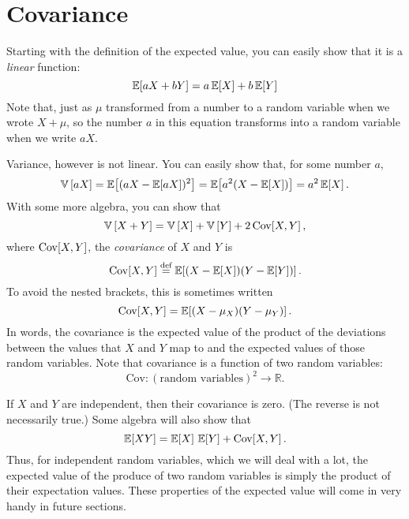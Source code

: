 \section{Covariance}

Starting with the definition of the expected value, you can easily show that
it is a \emph{linear} function:
\begin{equation*}
\mathbb{E}\!\left[{aX + bY}\right] = a \,\mathbb{E}\!\left[{X}\right] + b \,\mathbb{E}\!\left[{Y}\right]
\end{equation*}
Note that, just as $\mu$ transformed from a number to a random variable when we wrote
$X + \mu$, so the number $a$ in this equation transforms into a random variable
when we write $aX$.

Variance, however is not linear. You can easily show that, for some number $a$,
\begin{equation*}
  \mathbb{V}\left[{aX}\right] = \mathbb{E}\!\left[{(aX - \mathbb{E}\!\left[{aX}\right])^2}\right] = \mathbb{E}\!\left[{a^2(X - \mathbb{E}\!\left[{X}\right])}\right] = a^2 \, \mathbb{E}\!\left[{X}\right].
\end{equation*}
With some more algebra, you can show that
\begin{equation*}
  \mathbb{V}\left[{X + Y}\right] = \mathbb{V}\left[{X}\right] + \mathbb{V}\left[{Y}\right] + 2 \,\mathrm{Cov}\!\left[{X, Y}\right],
\end{equation*}
where $\mathrm{Cov}\!\left[{X, Y}\right]$, the \emph{covariance} of $X$ and $Y$ is
\begin{equation*}
  \mathrm{Cov}\!\left[{X, Y}\right] \stackrel{\text{def}}{=} \mathbb{E}\!\left[{(X - \mathbb{E}\!\left[{X}\right])(Y - \mathbb{E}\!\left[{Y}\right])}\right].
\end{equation*}
To avoid the nested brackets, this is sometimes written
\begin{equation*}
\mathrm{Cov}\!\left[{X, Y}\right] = \mathbb{E}\!\left[{(X - \mu_X)(Y - \mu_Y)}\right].
\end{equation*}
In words, the covariance is the expected value of the product of the
deviations between the values that $X$ and $Y$ map to and the expected values
of those random variables.
Note that covariance is a function of two random variables:
\begin{equation*}
  \mathrm{Cov} : (\text{random variables})^2 \to \mathbb{R}.  
\end{equation*}

If $X$ and $Y$ are independent, then their covariance is zero. (The reverse is
not necessarily true.) Some algebra will also show that
\begin{equation}
\mathbb{E}\!\left[{XY}\right] = \mathbb{E}\!\left[{X}\right] \, \mathbb{E}\!\left[{Y}\right] + \mathrm{Cov}\!\left[{X, Y}\right].
\end{equation}
Thus, for independent random variables, which we will deal with a lot,
the expected value of the produce of two random variables is simply the
product of their expectation values. These properties of the expected value
will come in very handy in future sections.

